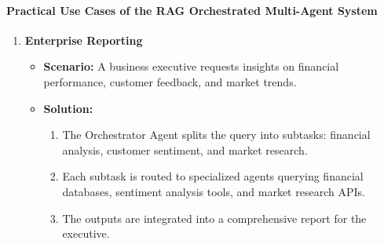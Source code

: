 \documentclass[12pt]{article}
\begin{document}
\paragraph{Practical Use Cases of the RAG Orchestrated Multi-Agent System}
\begin{enumerate}
    \item \textbf{Enterprise Reporting}
    \begin{itemize}
        \item \textbf{Scenario:} A business executive requests insights on financial performance, customer feedback, and market trends.
        \item \textbf{Solution:}
        \begin{enumerate}
            \item The Orchestrator Agent splits the query into subtasks: financial analysis, customer sentiment, and market research.
            \item Each subtask is routed to specialized agents querying financial databases, sentiment analysis tools, and market research APIs.
            \item The outputs are integrated into a comprehensive report for the executive.
        \end{enumerate}
    \end{itemize}


\end{enumerate}
\end{document}
